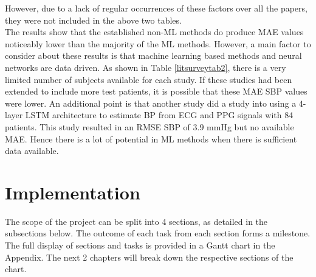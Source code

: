\documentclass[11pt, a4paper]{article}
\begin{document}
\begin{itemize}
\end{itemize}\noindent However, due to a lack of regular occurrences of these factors over all the papers, they were not included in the above two tables.\\ \newline \noindent The results show that the established non-ML methods do produce MAE values noticeably lower than the majority of the ML methods. However, a main factor to consider about these results is that machine learning based methods and neural networks are data driven. As shown in Table \ref{litsurveytab2}, there is a very limited number of subjects available for each study. If these studies had been extended to include more test patients, it is possible that these MAE SBP values were lower. An additional point is that another study \cite{Su2017} did a study into using a 4-layer LSTM architecture to estimate BP from ECG and PPG signals with 84 patients. This study resulted in an RMSE SBP of $3.9$ mmHg but no available MAE. Hence there is a lot of potential in ML methods when there is sufficient data available.


\newpage

\section{Implementation}
The scope of the project can be split into 4 sections, as detailed in the subsections below. The outcome of each task from each section forms a milestone. The full display of sections and tasks is provided in a Gantt chart \cite{Gantt} in the Appendix. The next 2 chapters will break down the respective sections of the chart.
\end{document}
